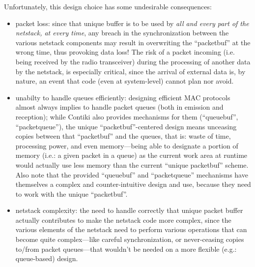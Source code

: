 \documentclass[12pt,twoside,a4paper]{article}
\begin{document}
Unfortunately, this design choice has some undesirable consequences:
\begin{itemize}
\item packet loss: since that unique buffer is to be used by \emph{all
      and every part of the netstack, at every time}, any breach in
      the synchronization between the various netstack components
      may result in overwriting the ``packetbuf'' at the wrong time,
      thus provoking data loss! The risk of a packet incoming (i.e. being
      received by the radio transceiver) during the processing of another
      data by the netstack, is especially critical, since the arrival of
      external data is, by nature, an event that code (even at
      system-level) cannot plan nor avoid.
\item unabilty to handle queues efficiently: designing efficient MAC protocols
      almost always implies to handle packet queues (both in emission and
      reception); while Contiki also provides mechanisms for them
      (``queuebuf'', ``packetqueue''), the unique ``packetbuf''-centered
      design means unceasing copies between that ``packetbuf'' and the queues,
      that is: waste of time, processing power, and even memory---being
      able to designate a portion of memory (i.e.: a given packet in a
      queue) as the current work area at runtime would actually use less
      memory than the current ``unique packetbuf'' scheme. Also note that
      the provided ``queuebuf'' and ``packetqueue'' mechanisms have themselves
      a complex and counter-intuitive design and use, because they need to
      work with the unique ``packetbuf''.
\item netstack complexity: the need to handle correctly that unique packet
      buffer actually contributes to make the netstack code more complex,
      since the various elements of the netstack need to perform various
      operations that can become quite complex---like careful synchronization,
      or never-ceasing copies to/from packet queues---that wouldn't be
      needed on a more flexible (e.g.: queue-based) design.
\end{itemize}
\end{document}
